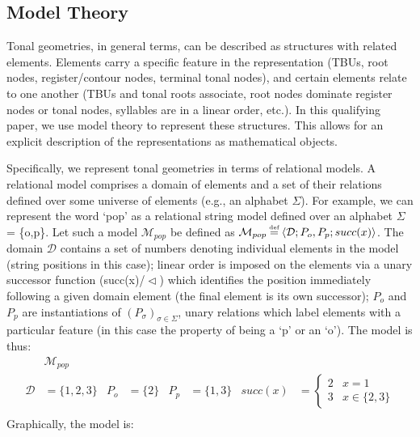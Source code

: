 \documentclass{article}
\newcommand\myeq{\mathrel{\stackrel{\makebox[0pt]{\mbox{\normalfont\tiny def}}}{=}}}
\begin{document}
\subsection{Model Theory}
Tonal geometries, in general terms, can be described as structures with related elements. Elements carry a specific feature in the representation (TBUs, root nodes, register/contour nodes, terminal tonal nodes), and certain elements relate to one another (TBUs and tonal roots associate, root nodes dominate register nodes or tonal nodes, syllables are in a linear order, etc.). In this qualifying paper, we use model theory to represent these structures. This allows for an explicit description of the representations as mathematical objects.\par
Specifically, we represent tonal geometries in terms of relational models. A relational model comprises a domain of elements and a set of their relations defined over some universe of elements (e.g., an alphabet $\Sigma$). For example, we can represent the word `pop' as a relational string model defined over an alphabet $\Sigma$ = \{o,p\}. Let such a model $\mathcal{M}_{pop}$ be defined as $\mathcal{M}_{pop}\myeq \langle \mathcal{D}; P_{o}, P_{p};succ(x) \rangle$. The domain $\mathcal{D}$ contains a set of numbers denoting individual elements in the model (string positions in this case); linear order is imposed on the elements via a unary successor function (succ(x)/$\vartriangleleft$) which identifies the position immediately following a given domain element (the final element is its own successor); $P_{o}$ and $P_{p}$ are instantiations of $(P_{\sigma})_{\sigma\in\Sigma}$, unary relations which label elements with a particular feature (in this case the property of being a `p' or an `o'). The model is thus:
\begin{equation}
\begin{aligned}
&\mathcal{M}_{pop} \\
\mathcal{D} &= \{1,2,3\} & P_{o}&= \{2\} & P_{p}&=\{1,3\} & succ(x) &= \begin{cases} 2 & x=1 \\ 3 & x\in\{2,3\} \end{cases}  \\  
\end{aligned}
\end{equation}
Graphically, the model is:
\begin{center}
\end{center}
\end{document}
